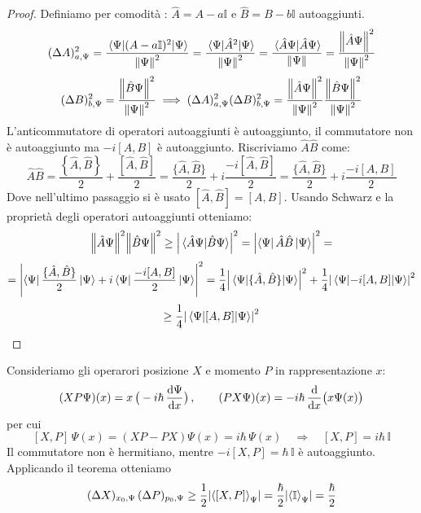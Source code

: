 \begin{proof}
    Definiamo per comodità : \(\hat{A} = A- a \mathbb{I}\) e \(\hat{B} = B - b\mathbb{I}\) autoaggiunti.
    \[
        (\Delta A)_{a,\Psi}^2 = \frac{\expval{(A-a\mathbb{I})^2}{\Psi}}{\norm{\Psi}^2} = \frac{\expval{\hat{A}^2}{\Psi}}{\norm{\Psi}^2} = \frac{\braket*{\hat{A}\Psi}{\hat{A}\Psi}}{\norm{\Psi}} = \frac{\norm{\hat{A}\Psi}^2}{\norm{\Psi}^2}
    \]
    \[
        (\Delta B)_{b,\Psi}^2 =\frac{\norm{\hat{B}\Psi}^2}{\norm{\Psi}^2} \implies  (\Delta A)_{a,\Psi}^2(\Delta B)_{b,\Psi}^2 = \frac{\norm{\hat{A}\Psi}^2}{\norm{\Psi}^2}\frac{\norm{\hat{B}\Psi}^2}{\norm{\Psi}^2} 
    \]
    L'anticommutatore di operatori autoaggiunti è autoaggiunto, il commutatore non è autoaggiunto ma \(-i[A,B]\) è autoaggiunto. Riscriviamo \(\hat{A}\hat{B}\) come:
    \[
        \hat{A}\hat{B}= \frac{\left\{ \hat{A},\hat{B} \right\}}{2} + \frac{[\hat{A},\hat{B}]}{2} = \frac{\{ \hat{A},\hat{B} \}}{2} + i \frac{-i[\hat{A},\hat{B}]}{2}=\frac{\{ \hat{A},\hat{B} \}}{2} + i \frac{-i[A,B]}{2}
    \]
    Dove nell'ultimo passaggio si è usato \([\hat{A},\hat{B}]= [A,B]\).
    Usando Schwarz e la proprietà degli operatori autoaggiunti otteniamo:
    \[
        \norm{\hat{A}\Psi}^2\norm{\hat{B}\Psi}^2 \geq \abs{\braket*{\hat{A}\Psi}{\hat{B}\Psi}}^2 = \abs{\bra{\Psi}\hat{A}\hat{B}\ket{\Psi}}^2=
    \]
    \[
        = \abs{\bra{\Psi}\frac{\{\hat{A},\hat{B}\}}{2}\ket{\Psi} + i \bra{\Psi}\frac{-i[A,B]}{2}\ket{\Psi}}^2
        = \frac{1}{4}\abs{\expval*{\{\hat{A},\hat{B}\}}{\Psi}}^2 + \frac{1}{4}\abs{\expval{-i[A,B]}{\Psi}}^2 
    \]
    \[
        \geq \frac{1}{4}\abs{\expval{[A,B]}{\Psi}}^2
    \]
\end{proof}

\begin{example}
    Consideriamo gli operarori posizione \(X\) e momento \(P\) in rappresentazione \(x\):
    \[
        (XP\Psi)(x)= x\,\big(-i\hbar\,\dv{\Psi}{x}\big)\,,\qquad (PX\Psi)(x)= -i\hbar\,\dv{}{x}\big(x\Psi(x)\big)
    \]
    per cui
    \[
        [X,P]\,\Psi(x)= (XP-PX)\Psi(x)= i\hbar\,\Psi(x) \quad \Rightarrow \quad [X,P]= i\hbar\,\mathbb{I}
    \]
    Il commutatore non è hermitiano, mentre \(-i[X,P]= \hbar\,\mathbb{I}\) è autoaggiunto. Applicando il teorema otteniamo
    \[
        (\Delta X)_{x_0,\Psi}\,(\Delta P)_{p_0,\Psi} \geq \frac{1}{2}\abs{\expval{[X,P]}_\Psi}
        = \frac{\hbar}{2} \abs{\expval{\mathbb{I}}_\Psi}= \frac{\hbar}{2}
    \]
\end{example}


